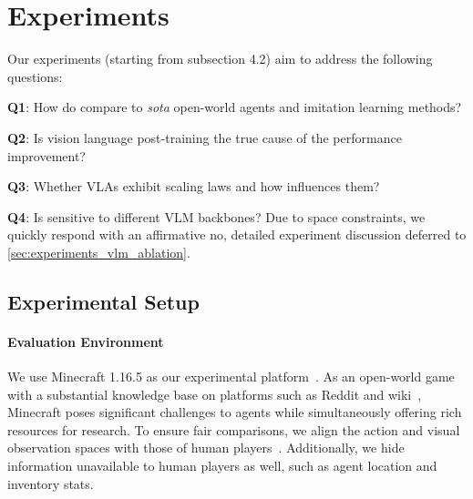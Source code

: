 	








\section{Experiments}

Our experiments (starting from subsection 4.2) aim to address the following questions:


\noindent \textbf{Q1}: How do \model compare to \textit{sota} open-world agents and imitation learning methods? 

\noindent \textbf{Q2}: Is vision language post-training the true cause of the performance improvement?

\noindent \textbf{Q3}: Whether VLAs exhibit scaling laws and how \method influences them?

\noindent \textbf{Q4}: Is \method sensitive to different VLM backbones? 
Due to space constraints, we quickly respond with an affirmative no, detailed experiment discussion deferred to \autoref{sec:experiments_vlm_ablation}.

\subsection{Experimental Setup}\label{sec:experimental_setups}

\paragraph{Evaluation Environment} 
We use Minecraft 1.16.5 as our experimental platform~\citep{minerl}. As an open-world game with a substantial knowledge base on platforms such as Reddit and wiki~\citep{minedojo}, Minecraft poses significant challenges to agents while simultaneously offering rich resources for research. To ensure fair comparisons, we align the action and visual observation spaces with those of human players~\citep{vpt}.
Additionally, we hide information unavailable to human players as well, such as agent location and inventory stats.

